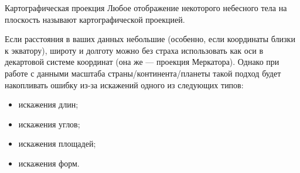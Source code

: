 \documentclass[
  ignorenonframetext,
  t]{beamer}
\providecommand{\tightlist}{%
  \setlength{\itemsep}{0pt}\setlength{\parskip}{0pt}}\usepackage{longtable,booktabs,array}
\begin{document}
\begin{frame}{Картографическая проекция}
\label{ux43aux430ux440ux442ux43eux433ux440ux430ux444ux438ux447ux435ux441ux43aux430ux44f-ux43fux440ux43eux435ux43aux446ux438ux44f}
Любое отображение некоторого небесного тела на плоскость называют
картографической проекцией.

Если расстояния в ваших данных небольшие (особенно, если координаты
близки к экватору), широту и долготу можно без страха использовать как
оси в декартовой системе координат (она же --- проекция Меркатора).
Однако при работе с данными масштаба страны/континента/планеты такой
подход будет накопливать ошибку из-за искажений одного из следующих
типов:

\begin{itemize}
\tightlist
\item
  искажения длин;
\item
  искажения углов;
\item
  искажения площадей;
\item
  искажения форм.
\end{itemize}
\end{frame}
\end{document}

